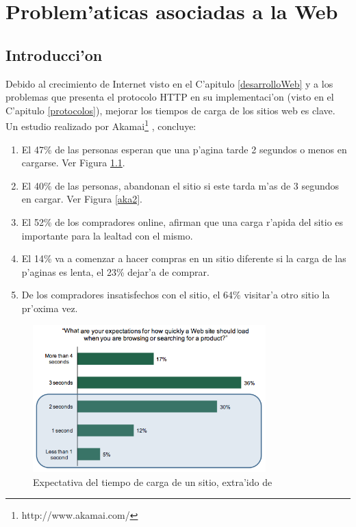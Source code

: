 \chapter{Problem'aticas asociadas a la Web}
\label{problematica}

\section{Introducci'on}

Debido al crecimiento de Internet visto en el C'apitulo \ref{desarrolloWeb} y a los problemas que presenta el protocolo HTTP en su implementaci'on (visto en el C'apitulo \ref{protocolos}), mejorar los tiempos de carga de los sitios web es clave. Un estudio realizado por Akamai\footnote{http://www.akamai.com/} \citep{akamaiPerf}, concluye:

\begin{enumerate}
\item El 47\% de las personas esperan que una p'agina tarde 2 segundos o menos en cargarse. Ver Figura \ref{aka1}.
\item El 40\% de las personas, abandonan el sitio si este tarda m'as de 3 segundos en cargar. Ver Figura \ref{aka2}.
\item El 52\% de los compradores online, afirman que una carga r'apida del sitio es importante para la lealtad con el mismo.
\item El 14\% va a comenzar a hacer compras en un sitio diferente si la carga de las p'aginas es lenta, el 23\% dejar'a de comprar.
\item De los compradores insatisfechos con el sitio, el 64\% visitar'a otro sitio la pr'oxima vez.
\end{enumerate}

\begin{figure}[ht!]
	\begin{center}
	\includegraphics[width=340px]{img/aka1}
	\caption{\small Expectativa del tiempo de carga de un sitio, extra'ido de \citep{akamaiPerf}}
	\end{center}
	\label{aka1}
\end{figure}

